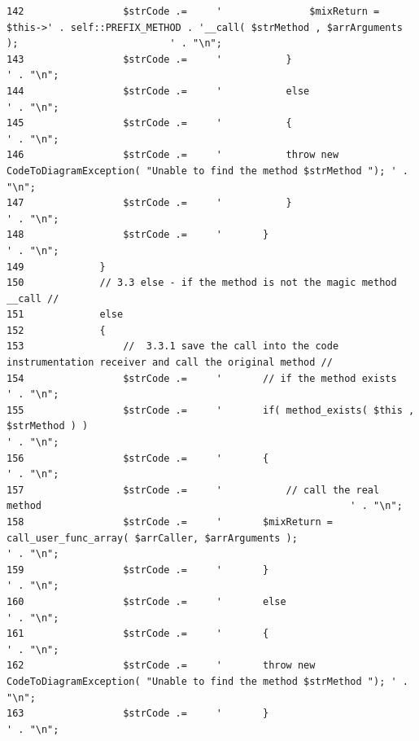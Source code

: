 \begin{Code}
\begin{verbatim}
142                 $strCode .=     '               $mixReturn = $this->' . self::PREFIX_METHOD . '__call( $strMethod , $arrArguments );                          ' . "\n";
143                 $strCode .=     '           }                                                                           ' . "\n";
144                 $strCode .=     '           else                                                                           ' . "\n";
145                 $strCode .=     '           {                                                                           ' . "\n";
146                 $strCode .=     '           throw new CodeToDiagramException( "Unable to find the method $strMethod "); ' . "\n";
147                 $strCode .=     '           }                                                                           ' . "\n";
148                 $strCode .=     '       }                                                                               ' . "\n";
149             }
150             // 3.3 else - if the method is not the magic method __call //
151             else
152             {
153                 //  3.3.1 save the call into the code instrumentation receiver and call the original method //
154                 $strCode .=     '       // if the method exists                                                                                                         ' . "\n";
155                 $strCode .=     '       if( method_exists( $this , $strMethod ) )                                                                               ' . "\n";
156                 $strCode .=     '       {                                                                               ' . "\n";
157                 $strCode .=     '           // call the real method                                                     ' . "\n";
158                 $strCode .=     '       $mixReturn = call_user_func_array( $arrCaller, $arrArguments );                         ' . "\n";
159                 $strCode .=     '       }                                                                               ' . "\n";
160                 $strCode .=     '       else                                                                            ' . "\n";
161                 $strCode .=     '       {                                                                               ' . "\n";
162                 $strCode .=     '       throw new CodeToDiagramException( "Unable to find the method $strMethod "); ' . "\n";
163                 $strCode .=     '       }                                                                               ' . "\n";

\end{verbatim}
\end{Code}
